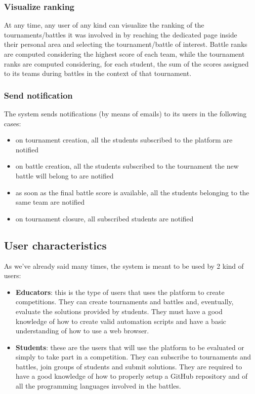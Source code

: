 \subsubsection{Visualize ranking}
At any time, any user of any kind can visualize the ranking of the tournaments/battles it was involved in by reaching the dedicated page inside their personal area and selecting the tournament/battle of interest. Battle ranks are computed considering the highest score of each team, while the tournament ranks are computed considering, for each student, the sum of the scores assigned to its teams during battles in the context of that tournament.
\subsubsection{Send notification}
The system sends notifications (by means of emails) to its users in the following cases:
\begin{itemize}
    \item on tournament creation, all the students subscribed to the platform are notified
    \item on battle creation, all the students subscribed to the tournament the new battle will belong to are notified
    \item as soon as the final battle score is available, all the students belonging to the same team are notified
    \item on tournament closure, all subscribed students are notified
\end{itemize}

\subsection{User characteristics}
As we’ve already said many times, the system is meant to be used by 2 kind of users:
\begin{itemize}
    \item \textbf{Educators}: this is the type of users that uses the platform to create competitions. They can create tournaments and battles and, eventually, evaluate the solutions provided by students. They must have a good knowledge of how to create valid automation scripts and have a basic understanding of how to use a web browser.
    \item \textbf{Students}: these are the users that will use the platform to be evaluated or simply to take part in a competition. They can subscribe to tournaments and battles, join groups of students and submit solutions. They are required to have a good knowledge of how to properly setup a GitHub repository and of all the programming languages involved in the battles.
\end{itemize} 

